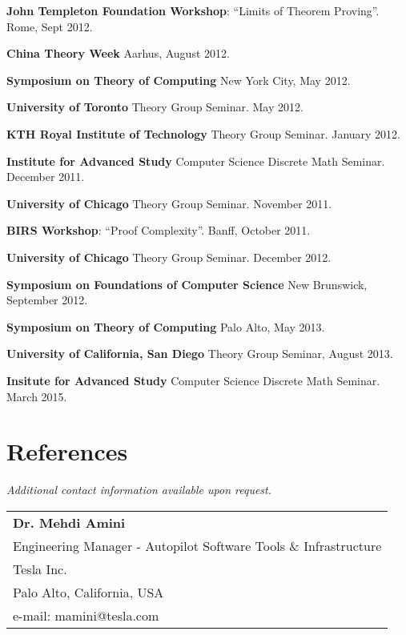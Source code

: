 \documentclass[margin,line]{resume}
\begin{document}
\begin{resume}
    \begin{list2}
	\item {\bf John Templeton Foundation Workshop}: ``Limits of Theorem Proving''. Rome, Sept 2012.
	\item {\bf China Theory Week} Aarhus, August 2012.
	\item {\bf Symposium on Theory of Computing} New York City, May 2012.
	\item {\bf University of Toronto} Theory Group Seminar. May 2012.
	\item {\bf KTH Royal Institute of Technology} Theory Group Seminar. January 2012.
	\item {\bf Institute for Advanced Study} Computer Science Discrete Math Seminar. December 2011.
	\item {\bf University of Chicago} Theory Group Seminar. November 2011.
	\item {\bf BIRS Workshop}: ``Proof Complexity''. Banff, October 2011.
	\item {\bf University of Chicago} Theory Group Seminar. December 2012.
	\item {\bf Symposium on Foundations of Computer Science} New Brunswick, September 2012.
	\item {\bf Symposium on Theory of Computing} Palo Alto, May 2013.
	\item {\bf University of California, San Diego} Theory Group Seminar, August 2013.
    \item {\bf Insitute for Advanced Study} Computer Science Discrete Math Seminar. March 2015.
    \end{list2}





 \newpage
 \section{\mysidestyle References} 
 \emph{Additional contact information available upon request.}

 \begin{tabular}{@{}p{12cm}}
 \textbf{Dr. Mehdi Amini}           \\
 Engineering Manager - Autopilot Software Tools \& Infrastructure            \\
 Tesla Inc.                           \\
 Palo Alto, California, USA                  \\
 e-mail: mamini@tesla.com          \\
 \end{tabular}


\end{resume}
\end{document}
